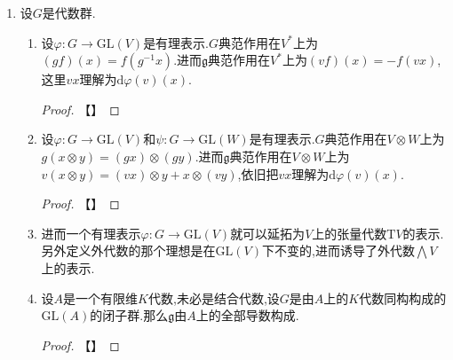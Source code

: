 \begin{enumerate}
\begin{enumerate}[(1)]
\begin{proof}
        	\qquad
        	
        	固定$v\in\mathfrak{a}$,把$\mathfrak{c}$视为仿射空间,那么它是自身的切空间考虑态射$\varphi:B\to\mathfrak{c}$为$b\mapsto v-\mathrm{Ad}(b)(v)$.它把$e$映为0,它的微分是$\mathrm{d}\varphi_e:\mathfrak{b}\to\mathfrak{c}$为$w\mapsto[v,w]$,于是这落在$\mathfrak{c}$中.
        \end{proof}
        \item $\gamma_g:G\to G$的核就是闭子群$\mathrm{C}_G(g)=\{h\in G\mid gh=hg\}$.我们断言有$\mathscr{L}(\mathrm{C}_G(g))\subseteq\mathfrak{c}_{\mathfrak{g}}(g)=\{v\in\mathfrak{g}\mid\mathrm{Ad}(g)(v)=v\}$(此为$g$的无穷小中心).如果$G=\mathrm{GL}(n,K)$那么这个包含式取等.
        \begin{proof}
        	
        	第一个命题是因为$(\mathrm{d}\gamma_g)_e=1-\mathrm{Ad}(g)$.第二个命题是因为我们解释过此时$\mathrm{Ad}(g)(v)=v$的元$v$就是满足$gv=vg$的元.于是$\mathrm{C}_G(g)$恰好由$\mathfrak{c}_{\mathfrak{g}}(g)$中的可逆矩阵构成.并且$\mathrm{C}_G(g)$是$\mathfrak{c}_{\mathfrak{g}}(g)$视为仿射空间的主开集,于是它们具有相同的(切空间)维数,于是这个包含关系取等.
        \end{proof}
    \end{enumerate}
    \item 设$G$是代数群.
    \begin{enumerate}[(1)]
    	\item 设$\varphi:G\to\mathrm{GL}(V)$是有理表示.$G$典范作用在$V^*$上为$(gf)(x)=f(g^{-1}x)$.进而$\mathfrak{g}$典范作用在$V^*$上为$(vf)(x)=-f(vx)$,这里$vx$理解为$\mathrm{d}\varphi(v)(x)$.
    	\begin{proof}
    		
    		【】
    	\end{proof}
    	\item 设$\varphi:G\to\mathrm{GL}(V)$和$\psi:G\to\mathrm{GL}(W)$是有理表示.$G$典范作用在$V\otimes W$上为$g(x\otimes y)=(gx)\otimes(gy)$.进而$\mathfrak{g}$典范作用在$V\otimes W$上为$v(x\otimes y)=(vx)\otimes y+x\otimes(vy)$,依旧把$vx$理解为$\mathrm{d}\varphi(v)(x)$.
    	\begin{proof}
    		
    		【】
    	\end{proof}
    	\item 进而一个有理表示$\varphi:G\to\mathrm{GL}(V)$就可以延拓为$V$上的张量代数$\mathrm{T}V$的表示.另外定义外代数的那个理想是在$\mathrm{GL}(V)$下不变的,进而诱导了外代数$\bigwedge V$上的表示.
    	\item 设$A$是一个有限维$K$代数,未必是结合代数,设$G$是由$A$上的$K$代数同构构成的$\mathrm{GL}(A)$的闭子群.那么$\mathfrak{g}$由$A$上的全部导数构成.
    	\begin{proof}
    		
    		【】
    	\end{proof}
    \end{enumerate}
\end{enumerate}
